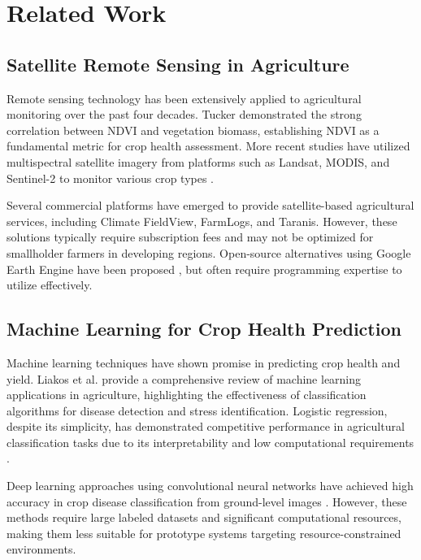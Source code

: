 \documentclass[journal]{IEEEtran}
\begin{document}
\section{Related Work}

\subsection{Satellite Remote Sensing in Agriculture}

Remote sensing technology has been extensively applied to agricultural monitoring over the past four decades. Tucker \cite{tucker1979red} demonstrated the strong correlation between NDVI and vegetation biomass, establishing NDVI as a fundamental metric for crop health assessment. More recent studies have utilized multispectral satellite imagery from platforms such as Landsat, MODIS, and Sentinel-2 to monitor various crop types \cite{weiss2020remote}.

Several commercial platforms have emerged to provide satellite-based agricultural services, including Climate FieldView, FarmLogs, and Taranis. However, these solutions typically require subscription fees and may not be optimized for smallholder farmers in developing regions. Open-source alternatives using Google Earth Engine have been proposed \cite{gorelick2017google}, but often require programming expertise to utilize effectively.

\subsection{Machine Learning for Crop Health Prediction}

Machine learning techniques have shown promise in predicting crop health and yield. Liakos et al. \cite{liakos2018machine} provide a comprehensive review of machine learning applications in agriculture, highlighting the effectiveness of classification algorithms for disease detection and stress identification. Logistic regression, despite its simplicity, has demonstrated competitive performance in agricultural classification tasks due to its interpretability and low computational requirements \cite{chlingaryan2018machine}.

Deep learning approaches using convolutional neural networks have achieved high accuracy in crop disease classification from ground-level images \cite{kamilaris2018deep}. However, these methods require large labeled datasets and significant computational resources, making them less suitable for prototype systems targeting resource-constrained environments.
\end{document}
